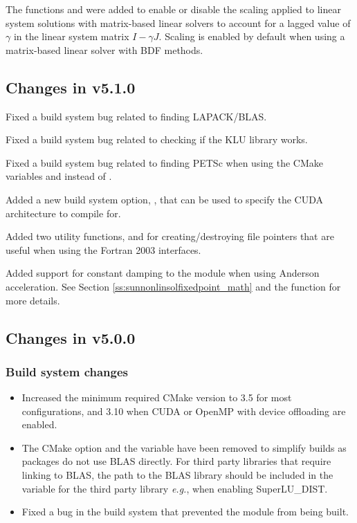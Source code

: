 The functions  and
 were added to enable or disable the scaling
applied to linear system solutions with matrix-based linear solvers to account
for a lagged value of $\gamma$ in the linear system matrix $I - \gamma J$.
Scaling is enabled by default when using a matrix-based linear
solver with BDF methods.

\subsection*{Changes in v5.1.0}

Fixed a build system bug related to finding LAPACK/BLAS.

Fixed a build system bug related to checking if the KLU library works.

Fixed a build system bug related to finding PETSc when using the CMake
variables  and  instead of
.

Added a new build system option, , that can be used to specify
the CUDA architecture to compile for.

Added two utility functions,  and 
for creating/destroying file pointers that are useful when using the Fortran
2003 interfaces.

Added support for constant damping to the 
module when using Anderson acceleration. See Section
\ref{ss:sunnonlinsolfixedpoint_math} and the
 function for more details.

\subsection*{Changes in v5.0.0}

\subsubsection*{Build system changes}

\begin{itemize}
\item Increased the minimum required CMake version to 3.5 for most {\sundials}
configurations, and 3.10 when CUDA or OpenMP with device offloading are enabled.
%
\item The CMake option  and the variable  have
been removed to simplify builds as {\sundials} packages do not use BLAS
directly. For third party libraries that require linking to BLAS, the path to
the BLAS library should be included in the  variable for the
third party library \textit{e.g.},  when enabling
SuperLU\_DIST.
%
\item Fixed a bug in the build system that prevented the {\nvecpthreads} module from
being built.
\end{itemize}

